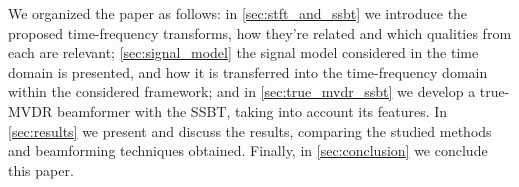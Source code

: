 We organized the paper as follows:
in \cref{sec:stft_and_ssbt} we introduce the proposed time-frequency transforms, how they're related and which qualities from each are relevant;
\cref{sec:signal_model} the signal model considered in the time domain is presented, and how it is transferred into the time-frequency domain within the considered framework;
and in \cref{sec:true_mvdr_ssbt} we develop a true-MVDR beamformer with the SSBT, taking into account its features. In \cref{sec:results} we present and discuss the results, comparing the studied methods and beamforming techniques obtained. Finally, in \cref{sec:conclusion} we conclude this paper.
